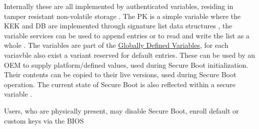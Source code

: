Internally these are all implemented by authenticated variables, residing in tamper resistant non-volatile storage \cite[32.3]{uefi-spec}.
The \ac{PK} is a simple variable where the \ac{KEK} and \ac{DB} are implemented through signature list data structures \cite[32.4.1]{uefi-spec}, the variable services can be used to append entries or to read and write the list as a whole \cite[32.3.5 and 32.5.3]{uefi-spec}.
The variables are part of the \hyperref[sec:uefi-pi:uefi:variables]{Globally Defined Variables}, for each variavble also exist a variant reserved for default entries. These can be used by an \ac{OEM} to supply platform\-/defined values, used during Secure Boot initialization.
Their contents can be copied to their live versions, used during Secure Boot operation.
The current state of Secure Boot is also reflected within a secure variable \cite[3.3]{uefi-spec}.

Users, who are physically present, may disable Secure Boot, enroll default or custom keys via the \ac{BIOS}

\cite[32.5.3.2]{uefi-spec}


